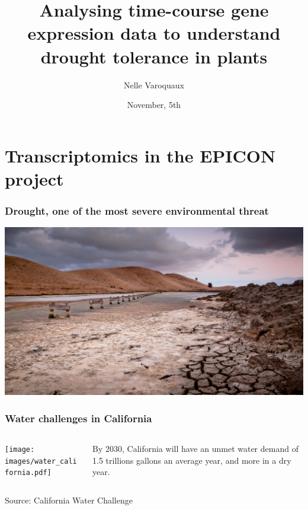\documentclass[xcolor=dvipsnames]{beamer}
\title{\textbf{Analysing time-course gene expression data to understand
drought tolerance in plants}}
\author[Varoquaux Nelle]{Nelle Varoquaux}
\date{November, 5th}
\institute{CNRS, TIMC, Grenoble}
\begin{document}
\begin{frame}[t, noframenumbering]
  \maketitle

\end{frame}

\setcounter{framenumber}{0}

\section{Transcriptomics in the EPICON project}

\begin{frame}
\frametitle{Drought, one of the most severe environmental threat}
\begin{center}
\vspace{-2.3em}
\hspace*{-3em}
\includegraphics[width=1.5\linewidth]{images/drought.jpg}
\end{center}
\end{frame}

\begin{frame}
\frametitle{Water challenges in California}
\begin{columns}
\begin{column}{0.5\linewidth}
\begin{flushright}
\texttt{[image: images/water\_california.pdf]}
\end{flushright}
\end{column}
\begin{column}{0.5\linewidth}
By 2030, California will have an unmet water demand of 1.5 trillions gallons an
average year, and more in a dry year.
\end{column}
\end{columns}
\begin{flushright}
\tiny
Source: California Water Challenge
\end{flushright}
\end{frame}
\end{document}
